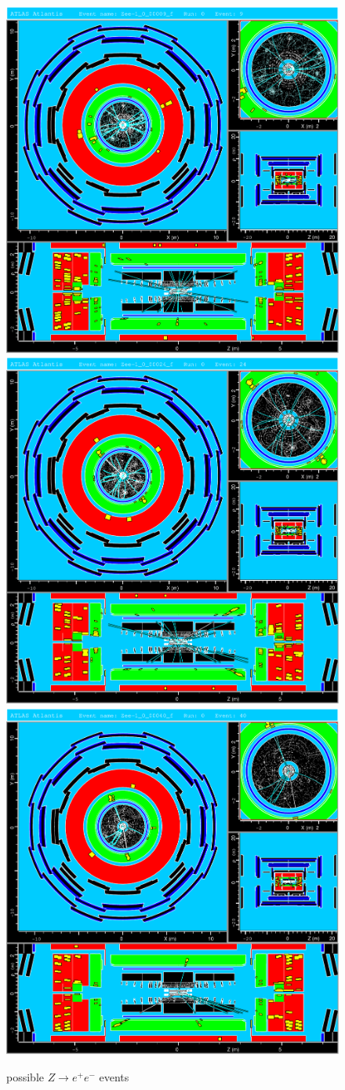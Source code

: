 \documentclass[11pt,a4paper,notitlepage]{scrartcl}
\begin{document}
\begin{figure}[htbp]
	\centering
	\includegraphics[width=.32\linewidth]{atlantis/zee_1}
	\includegraphics[width=.32\linewidth]{atlantis/zee_2}
	\includegraphics[width=.32\linewidth]{atlantis/zee_3}
	\caption{possible $Z\to e^+e^-$ events}
	\label{fig:zee}
\end{figure}
\end{document}

